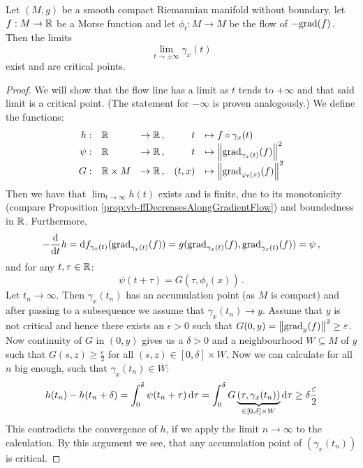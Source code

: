 \begin{proposition}\label{prop:morse-limitsAreCritical} Let $(M,g)$ be a smooth compact Riemannian manifold without boundary, let $f:M\to \mathbb{R}$ be a Morse function and let $\phi_t:M\to M$ be the flow of $-\mathrm{grad}(f)$. 
	Then the limits 
	\begin{equation*}
		\lim_{t\to \pm \infty}\gamma_x(t)
	\end{equation*} exist and are critical points. 
\end{proposition}
\begin{proof}We will show that the flow line has a limit as $t$ tends to $+\infty$ and that said limit is a critical point. (The statement for $-\infty$ is proven analogously.) We define the functions:
\begin{equation*}
	\begin{array}{rllrl}
		h:& \mathbb{R} &\to \mathbb{R}\,,&t&\mapsto  f\circ \gamma_x(t)\\
		\psi:&\mathbb{R} &\to \mathbb{R}\,,&t&\mapsto   \left\lVert\mathrm{grad}_{\gamma_x(t)}(f)\right\rVert^2\\
		G:& \mathbb{R}\times M&\to \mathbb{R}\,,&(t,x)&\mapsto \left\lVert\mathrm{grad}_{{\varphi_t(x)}}(f)\right\rVert^2
	\end{array}
\end{equation*}
Then we have that $\lim_{t\to \infty}h(t)$ exists and is finite, due to its monotonicity (compare Proposition \ref{prop:vb-ffDecreasesAlongGradientFlow}) and boundedness in $\mathbb{R}$. Furthermore,
\begin{equation*}
	-\frac{\mathop{}\!\mathrm{d}}{\mathop{}\!\mathrm{d} t} h=\mathop{}\!\mathrm{d} f_{\gamma_x(t)}(\mathrm{grad}_{\gamma_x(t)}(f))=g(\mathrm{grad}_{\gamma_x(t)}(f),\mathrm{grad}_{\gamma_x(t)}(f))=\psi\,,
\end{equation*} and for any $t,\tau \in \mathbb{R}$:
\begin{equation*}
	\psi(t+\tau)=G(\tau,\phi_t(x))\,.
\end{equation*}
Let $t_n\to \infty$. Then $\gamma_x(t_n)$ has an accumulation point (as $M$ is compact) and after passing to a subsequence we assume that $\gamma_x(t_n)\to y$. Assume that $y$ is not critical and hence there exists an $\epsilon>0$ such that $G(0,y)=\left\lVert\mathrm{grad}_{y}(f)\right\rVert^2\geq \varepsilon$. 
Now continuity of $G$ in $(0,y)$ gives us a $\delta>0$ and a neighbourhood $W\subseteq M$ of $y$ such that $G(s,z)\geq \frac{\epsilon}{2}$ for all $(s,z) \in [0,\delta]\times W$. Now we can calculate for all $n$ big enough, such that $\gamma_x(t_n)\in W$:
\begin{equation*}
	h(t_n)-h(t_n+\delta)
	=\int_{0}^{\delta}\psi(t_n+\tau)\mathop{}\!\mathrm{d} \tau
	=\int_{0}^{\delta}G\underbrace{(\tau,\gamma_x(t_n))}_{\in[0,\delta]\times W}\mathop{}\!\mathrm{d} \tau \geq \delta \frac{\varepsilon}{2}
\end{equation*}
This contradicts the convergence of $h$, if we apply the limit $n\to \infty$ to the calculation. By this argument we see, that any accumulation point of $(\gamma_x(t_n))$ is critical. 



\end{proof}
